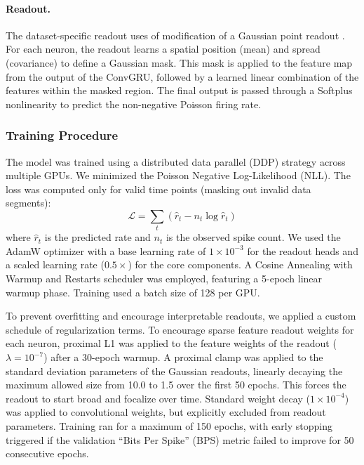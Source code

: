 \documentclass{lite}
\begin{document}
\paragraph{Readout.} The dataset-specific readout uses of modification of a Gaussian point readout \cite{lurz2020generalization}. For each neuron, the readout learns a spatial position (mean) and spread (covariance) to define a Gaussian mask. This mask is applied to the feature map from the output of the ConvGRU, followed by a learned linear combination of the features within the masked region. The final output is passed through a Softplus nonlinearity to predict the non-negative Poisson firing rate.

\subsubsection{Training Procedure}
The model was trained using a distributed data parallel (DDP) strategy across multiple GPUs. We minimized the Poisson Negative Log-Likelihood (NLL). The loss was computed only for valid time points (masking out invalid data segments):
\begin{equation}
    \mathcal{L} = \sum_{t} \left( \hat{r}_t - n_t \log \hat{r}_t \right)
\end{equation}
where $\hat{r}_t$ is the predicted rate and $n_t$ is the observed spike count. We used the AdamW optimizer with a base learning rate of $1 \times 10^{-3}$ for the readout heads and a scaled learning rate ($0.5 \times$) for the core components. A Cosine Annealing with Warmup and Restarts scheduler was employed, featuring a 5-epoch linear warmup phase. Training used a batch size of 128 per GPU.

To prevent overfitting and encourage interpretable readouts, we applied a custom schedule of regularization terms. To encourage sparse feature readout weights for each neuron, proximal L1 was applied to the feature weights of the readout ($\lambda = 10^{-7}$) after a 30-epoch warmup. A proximal clamp was applied to the standard deviation parameters of the Gaussian readouts, linearly decaying the maximum allowed size from 10.0 to 1.5 over the first 50 epochs. This forces the readout to start broad and focalize over time.
Standard weight decay ($1 \times 10^{-4}$) was applied to convolutional weights, but explicitly excluded from readout parameters. Training ran for a maximum of 150 epochs, with early stopping triggered if the validation ``Bits Per Spike'' (BPS) metric failed to improve for 50 consecutive epochs.
\end{document}
